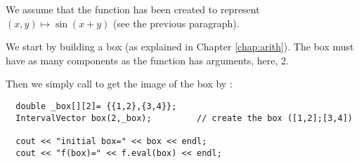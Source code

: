 We assume that the function  has been created to represent $(x,y)\mapsto \sin(x+y)$ (see the previous paragraph).

We start by building a box (as explained in Chapter \ref{chap:arith}).
The box must have as many components as the function has arguments, here, 2.

Then we simply call  to get the image of the box by :

\begin{lstlisting}
  double _box[][2]= {{1,2},{3,4}};
  IntervalVector box(2,_box);         // create the box ([1,2];[3,4])

  cout << "initial box=" << box << endl;
  cout << "f(box)=" << f.eval(box) << endl; 
\end{lstlisting}



